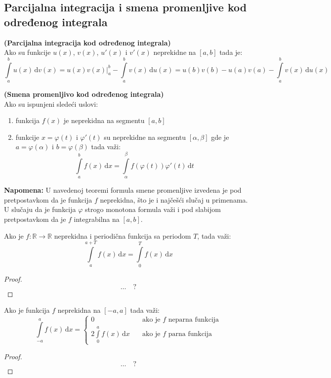 \subsection{Parcijalna integracija i smena promenljive kod određenog integrala}
\begin{theorem}
	\textbf{(Parcijalna integracija kod određenog integrala)}\\
	Ako su funkcije $u(x)$, $v(x)$, $u'(x)$ i $v'(x)$ neprekidne na $[a,b]$ tada je:
	$$\int\limits^b_a u(x)\, \mathrm{d} v(x) = u(x)v(x)|^b_a - \int\limits^b_a v(x)\, \mathrm{d} u(x) = u(b)v(b) - u(a)v(a) - \int\limits^b_a v(x)\, \mathrm{d} u(x)$$
\end{theorem}
\begin{theorem}
	\textbf{(Smena promenljivo kod određenog integrala)}\\
	Ako su ispunjeni sledeći uslovi:
	\begin{enumerate}[label = \alph*)]
		\item 
			funkcija $f(x)$ je neprekidna na segmentu $[a,b]$
		\item 
			funkcije $x=\varphi(t)$ i $\varphi'(t)$ su neprekidne na segmentu $[\alpha, \beta]$ gde je $a = \varphi(\alpha)$ i $b = \varphi(\beta)$ tada važi:
			$$\int \limits^b_a f(x) \, \mathrm{d}x = \int \limits^\beta_\alpha f(\varphi(t))\varphi'(t)\, \mathrm{d}t$$
	\end{enumerate}
	\textbf{Napomena:} U navedenoj teoremi formula smene promenljive izvedena je pod pretpostavkom da je funkcija $f$ neprekidna, što je i najčešći slučaj u primenama. U slučaju da je funkcija $\varphi$ strogo monotona formula važi i pod slabijom pretpostavkom da je $f$ integrabilna na $[a,b]$.
\end{theorem}
\begin{theorem}
	Ako je $f:\mathbb{R}\to \mathbb{R}$ neprekidna i periodična funkcija sa periodom $T$, tada važi:
	$$\int \limits^{a+T}_a f(x) \, \mathrm{d}x = \int \limits^T_0 f(x) \, \mathrm{d}x$$
\end{theorem}
\begin{proof}
$$\ldots \quad \text{?}$$
\end{proof}
\begin{theorem}
	Ako je funkcija $f$ neprekidna na $[-a, a]$ tada važi:
	$$\int \limits^a_{-a}f(x)\, \mathrm{d} x =
	\begin{cases}
		0 &\text{ako je }f\text{ neparna funkcija}\\
		2\int\limits^a_0 f(x)\, \mathrm{d} x \quad &\text{ako je }f\text{ parna funkcija}
	\end{cases}
	$$
\end{theorem}
\begin{proof}
$$\ldots \quad \text{?}$$
\end{proof}

